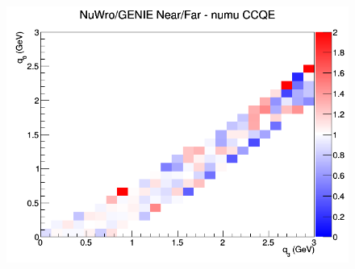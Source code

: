 \documentclass[12pt]{article}
\begin{document}
\begin{figure}[h]
\endminipage
{}
\includegraphics[width=\linewidth]{q0_q3/nominal/ratios/CCQE_NuWro_GENIE_numu_NF_q3_q0.png}
\endminipage
\newline
\end{figure}
\clearpage
\end{document}
